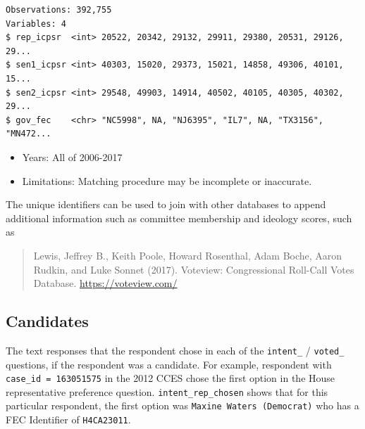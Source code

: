 \documentclass[10pt,article,oneside]{memoir}
\theoremstyle{definition}
\newenvironment{Shaded}{\begin{snugshade}}{\end{snugshade}}
\newcommand{\DecValTok}[1]{\textcolor[rgb]{0.00,0.00,0.81}{#1}}
\newcommand{\KeywordTok}[1]{\textcolor[rgb]{0.13,0.29,0.53}{\textbf{#1}}}
\newcommand{\NormalTok}[1]{#1}
\newcommand{\OperatorTok}[1]{\textcolor[rgb]{0.81,0.36,0.00}{\textbf{#1}}}
\newcommand{\StringTok}[1]{\textcolor[rgb]{0.31,0.60,0.02}{#1}}
\begin{document}
\begin{verbatim}
Observations: 392,755
Variables: 4
$ rep_icpsr  <int> 20522, 20342, 29132, 29911, 29380, 20531, 29126, 29...
$ sen1_icpsr <int> 40303, 15020, 29373, 15021, 14858, 49306, 40101, 15...
$ sen2_icpsr <int> 29548, 49903, 14914, 40502, 40105, 40305, 40302, 29...
$ gov_fec    <chr> "NC5998", NA, "NJ6395", "IL7", NA, "TX3156", "MN472...
\end{verbatim}

\begin{itemize}
\tightlist
\item
  Years: All of 2006-2017
\item
  Limitations: Matching procedure may be incomplete or inaccurate.
\end{itemize}

The unique identifiers can be used to join with other databases to
append additional information such as committee membership and ideology
scores, such as

\begin{quote}
Lewis, Jeffrey B., Keith Poole, Howard Rosenthal, Adam Boche, Aaron
Rudkin, and Luke Sonnet (2017). Voteview: Congressional Roll-Call Votes
Database. \url{https://voteview.com/}
\end{quote}

\hypertarget{candidates}{%
\subsection{Candidates}\label{candidates}}

The text responses that the respondent chose in each of the
\texttt{intent\_} / \texttt{voted\_} questions, if the respondent was a
candidate. For example, respondent with \texttt{case\_id\ =\ 163051575}
in the 2012 CCES chose the first option in the House representative
preference question. \texttt{intent\_rep\_chosen} shows that for this
particular respondent, the first option was
\texttt{Maxine\ Waters\ (Democrat)} who has a FEC Identifier of
\texttt{H4CA23011}.

\begin{Shaded}
\end{Shaded}
\end{document}
